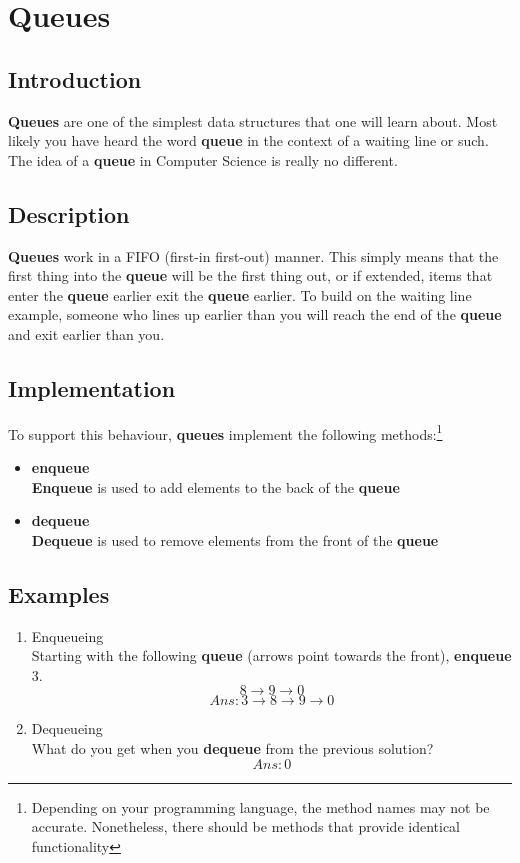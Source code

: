 \documentclass[11pt]{book}
\begin{document}
	\chapter{Queues}
	\section{Introduction}
		\textbf{Queues} are one of the simplest data structures that one will
		learn about. Most likely you have heard the word \textbf{queue} in the
		context of a waiting line or such. The idea of a \textbf{queue} in
		Computer Science is really no different.

	\section{Description}
		\textbf{Queues} work in a FIFO (first-in first-out) manner. This simply
		means that the first thing into the \textbf{queue} will be the first
		thing out, or if extended, items that enter the \textbf{queue} earlier
		exit the \textbf{queue} earlier. To build on the waiting line example,
		someone who lines up earlier than you will reach the end of the
		\textbf{queue} and exit earlier than you.

	\section{Implementation}
		To support this behaviour, \textbf{queues} implement the following
		methods:\footnote{Depending on your programming language, the method
		names may not be accurate. Nonetheless, there should be methods that
		provide identical functionality}
		\begin{itemize}
			\item \textbf{enqueue} \\
				\textbf{Enqueue} is used to add elements to the back of the
				\textbf{queue}
			\item \textbf{dequeue} \\
				\textbf{Dequeue} is used to remove elements from the front of
				the \textbf{queue}
		\end{itemize}
		
	\section{Examples}
		\begin{enumerate}
			\item Enqueueing \\
				Starting with the following \textbf{queue} (arrows point towards
				the front), \textbf{enqueue} 3.
				\[
					8 \rightarrow 9 \rightarrow 0
				\]
				\[
					Ans: 3 \rightarrow 8 \rightarrow 9 \rightarrow 0
				\]
			\item Dequeueing \\
				What do you get when you \textbf{dequeue} from the previous
				solution?
				\[
					Ans: 0
				\]
		\end{enumerate}
\end{document}
